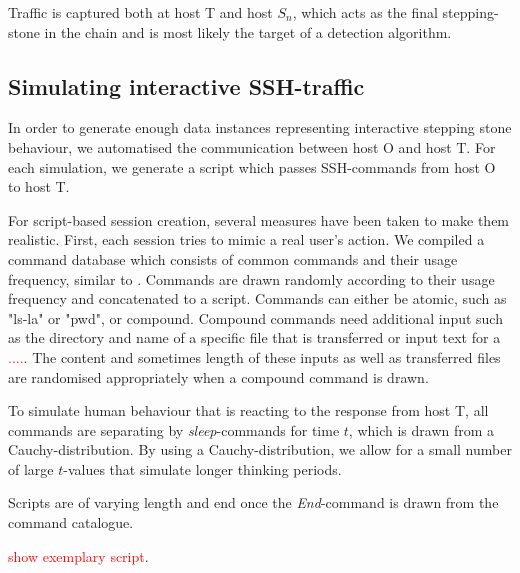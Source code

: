 \documentclass[runningheads]{llncs}\usepackage[]{graphicx}\usepackage[]{color}
\begin{document}
Traffic is captured both at host T and host $S_n$, which acts as the final stepping-stone in the chain and is most likely the target of a detection algorithm. 








\subsection{Simulating interactive SSH-traffic}\label{Sec:Simulating_interactive}

In order to generate enough data instances representing interactive stepping stone behaviour, we automatised the communication between host O and host T.  For each simulation, we generate a script which passes SSH-commands from host O to host T.

For script-based session creation, several measures have been taken to make them realistic. First, each session tries to mimic a real user's action. We compiled a command database which consists of common commands and their usage frequency, similar to \cite{xin2006testbed}.%
Commands are drawn randomly according to their usage frequency and concatenated to a script. 
Commands can either be atomic, such as "ls-la" or "pwd", or compound. Compound commands need additional input such as the directory and name of a specific file that is transferred or input text for a \textcolor{red}{....}. The content and sometimes length of these inputs as well as transferred files are randomised appropriately when a compound command is drawn. 

To simulate human behaviour that is reacting to the response from host T, all commands are separating by \textit{sleep}-commands for time $t$, which is drawn from a Cauchy-distribution. By using a Cauchy-distribution, we allow for a small number of large $t$-values that simulate longer thinking periods.  


Scripts are of varying length and end once the \textit{End}-command is drawn from the command catalogue. 

\textcolor{red}{show exemplary script}.

\end{document}
